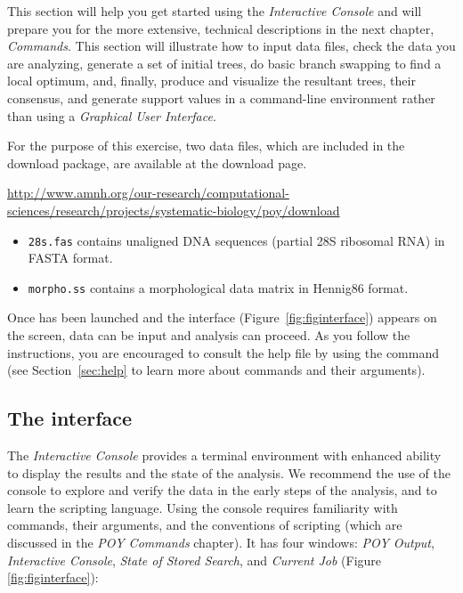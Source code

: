 {This section will help you get started using the \poy \emph{Interactive 
Console} and will prepare you for the more extensive, technical descriptions 
in the next chapter, \emph{\poy Commands}.
This section will illustrate how to input data files, check the data you are 
analyzing, generate a set of initial trees, do basic branch 
swapping to find a local optimum, and, finally, produce and visualize 
the resultant trees, their consensus, and generate support 
values in a command-line environment rather than using a 
\emph{Graphical User Interface}. 

For the purpose of this exercise, two data files, which are included in the 
download package, are available at the \poy download page.\\
\begin{center}
\url{http://www.amnh.org/our-research/computational-sciences/research/projects/systematic-biology/poy/download}
\end{center}

\begin{itemize}
\item {\texttt{28s.fas} contains unaligned DNA sequences (partial 28S 
ribosomal RNA) in FASTA format.~\cite{pearson1988}}
\item {\texttt{morpho.ss} contains a morphological data matrix in 
Hennig86 format.~\cite{farris1988}}
\end{itemize}

Once \poy has been launched and the interface (Figure~\ref{fig:figinterface})  
appears on the screen, data can be input and analysis can proceed. As you 
follow the instructions, you are encouraged to consult the help file by using 
the command  (see Section~\ref{sec:help} to learn 
more about \poy commands and their arguments).

\subsection{The interface}

The \emph{Interactive Console} provides a terminal environment with
enhanced ability to display the results and the state of the analysis.
We recommend the use of the console to explore and verify the data
in the early steps of the analysis, and to learn the scripting
language. Using the console requires familiarity with \poy commands,
their arguments, and the conventions of \poy scripting (which are
discussed in the \emph{POY Commands} chapter). It has four windows:
\emph{POY Output}, \emph{Interactive Console}, \emph{State of Stored
Search}, and \emph{Current Job} (Figure \ref{fig:figinterface}):


}
